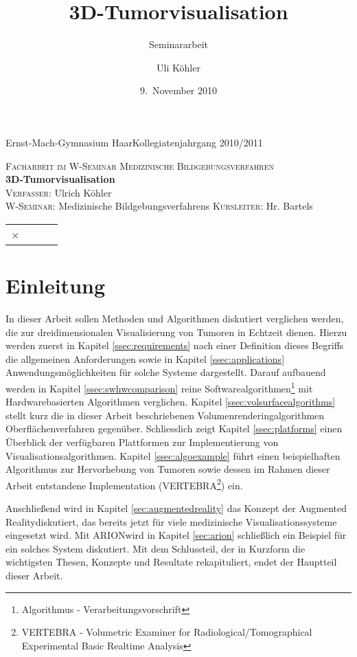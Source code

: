 \documentclass[pdftex,a4paper,titlepage,12pt]{scrartcl}
\title{3D-Tumorvisualisation}
\subtitle{Seminararbeit}
\author{Uli Köhler}
\date{9.~November 2010}
\newtheorem[L]{boxedDefinition}{Definition}
\begin{document}
\begin{titlepage}
 Ernst-Mach-Gymnasium Haar\hfill Kollegiatenjahrgang 2010/2011
\vspace{2cm}
\begin{center}
 \large\textsc{Facharbeit im W-Seminar \glqq Medizinische Bildgebungsverfahren\grqq}\\[1.5cm]
 {\Huge \textbf{3D-Tumorvisualisation}}\\[1cm]
 \textsc{Verfasser:} Ulrich Köhler\\
 \textsc{W-Seminar:} Medizinische Bildgebungsverfahrens
 \textsc{Kursleiter:} Hr. Bartels\\[2cm]

\begin{tabular}[c]{l|c|c|c}
 ×
\end{tabular}

\end{center}

\end{titlepage}


\thispagestyle{empty}\newpage
\tableofcontents\thispagestyle{empty}\newpage
\section{Einleitung}\label{sec:introduction}
In dieser Arbeit sollen Methoden und Algorithmen diskutiert verglichen werden, die zur dreidimensionalen Visualisierung von Tumoren in Echtzeit dienen. Hierzu werden zuerst in Kapitel \vref{ssec:requirements} nach einer Definition dieses Begriffs die allgemeinen Anforderungen sowie in Kapitel \vref{ssec:applications} Anwendungsmöglichkeiten für solche Systeme dargestellt. Darauf aufbauend werden in Kapitel \vref{ssec:swhwcomparison} reine Softwarealgorithmen\footnote{Algorithmus - Verarbeitungsvorschrift} mit Hardwarebasierten Algorithmen verglichen. Kapitel \vref{ssec:volsurfacealgorithms} stellt kurz die in dieser Arbeit beschriebenen Volumenrenderingalgorithmen Oberflächenverfahren gegenüber. Schliesslich zeigt Kapitel \vref{ssec:platforms} einen Überblick der verfügbaren Plattformen zur Implementierung von Visualisationsalgorithmen. Kapitel \vref{ssec:algoexample} führt einen beispielhaften Algorithmus zur Hervorhebung von Tumoren sowie dessen im Rahmen dieser Arbeit entstandene Implementation (\glqq VERTEBRA\footnote{VERTEBRA - Volumetric Examiner for Radiological/Tomographical Experimental Basic Realtime Analysis}\grqq) ein.

Anschließend wird in Kapitel \vref{sec:augmentedreality} das Konzept der \glqq Augmented Reality\grqq diskutiert, das bereits jetzt für viele medizinische Visualisationssysteme eingesetzt wird. Mit ARION\texttrademark wird in Kapitel \vref{sec:arion} schließlich ein Beispiel für ein solches System diskutiert.
Mit dem Schlussteil, der in Kurzform die wichtigsten Thesen, Konzepte und Resultate rekapituliert, endet der Hauptteil dieser Arbeit.
\end{document}
